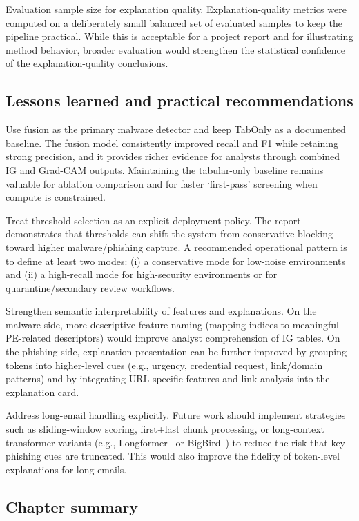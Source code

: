 \documentclass[conference]{IEEEtran}
\begin{document}
Evaluation sample size for explanation quality. Explanation-quality metrics were computed on a deliberately small balanced set of evaluated samples to keep the pipeline practical. While this is acceptable for a project report and for illustrating method behavior, broader evaluation would strengthen the statistical confidence of the explanation-quality conclusions.

\subsection{Lessons learned and practical recommendations}

Use fusion as the primary malware detector and keep TabOnly as a documented baseline. The fusion model consistently improved recall and F1 while retaining strong precision, and it provides richer evidence for analysts through combined IG and Grad-CAM outputs. Maintaining the tabular-only baseline remains valuable for ablation comparison and for faster ‘first-pass’ screening when compute is constrained.

Treat threshold selection as an explicit deployment policy. The report demonstrates that thresholds can shift the system from conservative blocking toward higher malware/phishing capture. A recommended operational pattern is to define at least two modes: (i) a conservative mode for low-noise environments and (ii) a high-recall mode for high-security environments or for quarantine/secondary review workflows.

Strengthen semantic interpretability of features and explanations. On the malware side, more descriptive feature naming (mapping indices to meaningful PE-related descriptors) would improve analyst comprehension of IG tables. On the phishing side, explanation presentation can be further improved by grouping tokens into higher-level cues (e.g., urgency, credential request, link/domain patterns) and by integrating URL-specific features and link analysis into the explanation card.

Address long-email handling explicitly. Future work should implement strategies such as sliding-window scoring, first+last chunk processing, or long-context transformer variants (e.g., Longformer~\cite{IMA2020} or BigBird~\cite{ZGDAA2020}) to reduce the risk that key phishing cues are truncated. This would also improve the fidelity of token-level explanations for long emails.

\subsection{Chapter summary}
\end{document}

